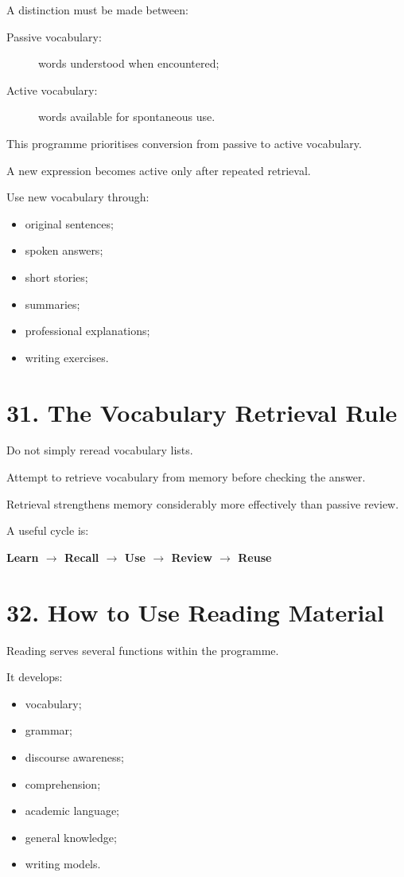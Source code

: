 A distinction must be made between:

\begin{description}
    \item[Passive vocabulary:] words understood when encountered;
    \item[Active vocabulary:] words available for spontaneous use.
\end{description}

This programme prioritises conversion from passive to active vocabulary.

A new expression becomes active only after repeated retrieval.

Use new vocabulary through:

\begin{itemize}
    \item original sentences;
    \item spoken answers;
    \item short stories;
    \item summaries;
    \item professional explanations;
    \item writing exercises.
\end{itemize}

\section*{31. The Vocabulary Retrieval Rule}

Do not simply reread vocabulary lists.

Attempt to retrieve vocabulary from memory before checking the answer.

Retrieval strengthens memory considerably more effectively than passive review.

A useful cycle is:

\begin{center}
\textbf{Learn $\rightarrow$ Recall $\rightarrow$ Use $\rightarrow$ Review $\rightarrow$ Reuse}
\end{center}

\section*{32. How to Use Reading Material}

Reading serves several functions within the programme.

It develops:

\begin{itemize}
    \item vocabulary;
    \item grammar;
    \item discourse awareness;
    \item comprehension;
    \item academic language;
    \item general knowledge;
    \item writing models.
\end{itemize}

